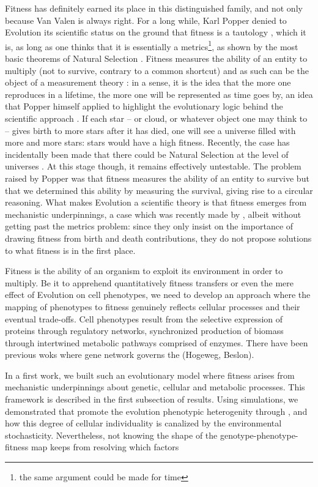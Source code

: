Fitness has definitely earned its place in this distinguished family, and not only because Van Valen is always right. For a long while, Karl Popper denied to Evolution its scientific status on the ground that fitness is a tautology \citep{Popper76}, which it is, as long as one thinks that it is essentially a metrics\footnote{the same argument could be made for time}, as shown by the most basic theorems of Natural Selection \citep{Fisher30,Price72b,Wagner10,Queller17}. Fitness measures the ability of an entity to multiply (not to survive, contrary to a common shortcut) and as such can be the object of a measurement theory \citep{Wagner10} : in a sense, it is the idea that the more one reproduces in a lifetime, the more one will be represented as time goes by, an idea that Popper himself applied to highlight the evolutionary logic behind the scientific approach \citep{Popper72}. If each star -- or cloud, or whatever object one may think to -- gives birth to more stars after it has died, one will see a universe filled with more and more stars: stars would have a high fitness. Recently, the case has incidentally been made that there could be Natural Selection at the level of universes \citep{Smolin97}. At this stage though, it remains effectively untestable. The problem raised by Popper was that fitness measures the ability of an entity to survive but that we determined this ability by measuring the survival, giving rise to a circular reasoning. What makes Evolution a scientific theory is that fitness emerges from mechanistic underpinnings, a case which was recently made by \citet{Doebeli17}, albeit without getting past the metrics problem:  since they only insist on the importance of drawing fitness from birth and death contributions, they do not propose solutions to what fitness is in the first place.

Fitness is the ability of an organism to exploit its environment in order to multiply. Be it to apprehend quantitatively fitness transfers or even the mere effect of Evolution on cell phenotypes, we need to develop an approach where the mapping of phenotypes to fitness genuinely reflects cellular processes and their eventual trade-offs. Cell phenotypes result from the selective expression of proteins through regulatory networks, synchronized production of biomass through intertwined metabolic pathways comprised of enzymes. There have been previous woks where gene network governs the (Hogeweg, Beslon).

In a first work, we built such an evolutionary model where fitness arises from mechanistic underpinnings about genetic, cellular and metabolic processes. This framework is described in the first subsection of results. Using simulations, we demonstrated that  promote the evolution phenotypic heterogenity through , and how this degree of cellular individuality is canalized by the environmental stochasticity. Nevertheless, not knowing the shape of the genotype-phenotype-fitness map keeps from resolving which factors 

